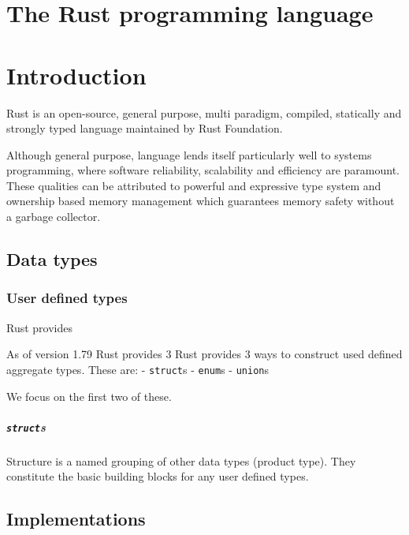 
\chapter{The Rust programming language}

\chapter*{Introduction}

Rust is an open-source, general purpose, multi paradigm, compiled, statically and strongly typed language maintained by Rust Foundation.

Although general purpose, language lends itself particularly well to systems programming, where software reliability, scalability and efficiency are paramount.
These qualities can be attributed to powerful and expressive type system and ownership based memory management which guarantees memory safety without a garbage collector.

\section{Data types}


\subsection{User defined types}

Rust provides 

As of version 1.79 Rust provides 3 Rust provides 3 ways to construct used defined aggregate types.
These are:
- \texttt{struct}s
- \texttt{enum}s
- \texttt{union}s

We focus on the first two of these.

\paragraph{\texttt{struct}s}

Structure is a named grouping of other data types (product type). They constitute the basic building blocks for any user defined types.

\section{Implementations}


